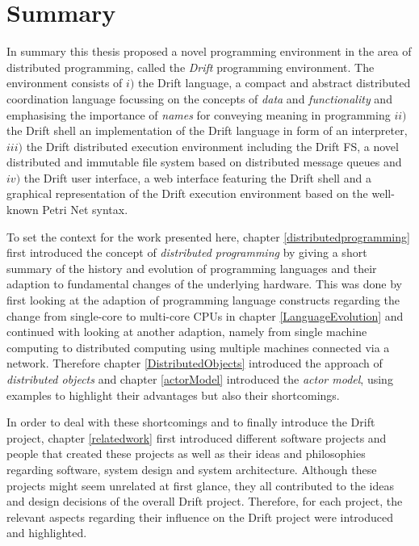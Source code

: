 \section{Summary}
\label{summary}

In summary this thesis proposed a novel programming environment
in the area of distributed programming, called the
\textit{Drift} programming environment. The environment consists
of $i)$ the Drift language, a compact and abstract distributed
coordination language focussing on the concepts of
\textit{data} and \textit{functionality} and emphasising
the importance of \textit{names} for conveying
meaning in programming $ii)$ the Drift shell an implementation
of the Drift language in form of an interpreter,
$iii)$ the Drift distributed execution
environment including the Drift FS, a novel distributed and
immutable file system based on distributed message queues and
$iv)$ the Drift user interface, a web interface featuring
the Drift shell and a graphical representation of the
Drift execution environment based on the well-known
Petri Net syntax.
\newline

To set the context for the work presented here,
chapter \ref{distributedprogramming} first introduced the concept of
\textit{distributed programming} by giving a short summary of the
history and evolution of programming languages and their adaption to
fundamental changes of the underlying hardware. This was done by first
looking at the adaption of programming language constructs regarding
the change from single-core to multi-core CPUs in chapter
\ref{LanguageEvolution}
and continued with looking at another adaption, namely from single
machine computing to distributed computing using multiple machines
connected via a network. Therefore chapter \ref{DistributedObjects}
introduced the approach of \textit{distributed objects} and
chapter \ref{actorModel} introduced the \textit{actor model},
using examples to highlight their advantages but also their shortcomings.
\newline

In order to deal with these shortcomings and to finally introduce
the Drift project, chapter \ref{relatedwork} first introduced
different software projects and people that
created these projects as well as their ideas and philosophies
regarding software, system design and system architecture. Although these
projects might seem unrelated at first glance, they all contributed
to the ideas and design decisions of the overall Drift project.
Therefore, for each project, the relevant aspects regarding
their influence on the Drift project were introduced and highlighted.

